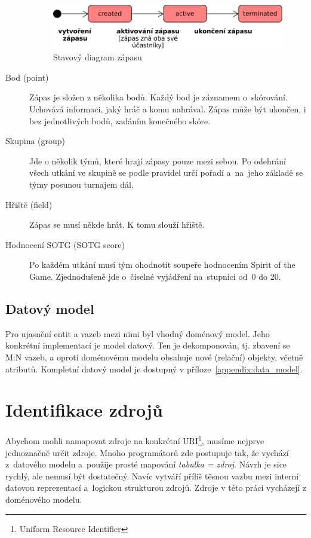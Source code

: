 \begin{description}
\begin{figure}[ht!]
      \includegraphics[width=110mm]{./images/stavovy-diagram-zapas.pdf}
      \caption{Stavový diagram zápasu\label{overflow}}
      \label{fig:state_match}
    \end{figure}
  \item[Bod (point)]
    Zápas je složen z několika bodů. Každý bod je záznamem o~skórování. Uchovává informaci, jaký hráč a komu nahrával.
    Zápas může být ukončen, i bez jednotlivých bodů, zadáním konečného skóre.
  \item[Skupina (group)]
    Jde o několik týmů, které hrají zápasy pouze mezi sebou. Po odehrání všech utkání ve skupině se podle pravidel určí pořadí a~na~jeho základě se týmy posunou turnajem dál.
  \item[Hřiště (field)]
    Zápas se musí někde hrát. K tomu slouží hřiště.
  \item[Hodnocení SOTG (SOTG score)]
    Po každém utkání musí tým ohodnotit soupeře hodnocením Spirit of the Game. Zjednodušeně jde o~číselné vyjádření na~stupnici od~0 do 20.
\end{description}

\subsection{Datový model}

Pro ujasnění entit a vazeb mezi nimi byl vhodný doménový model. Jeho konkrétní implementací je model datový.
Ten je dekomponován, tj. zbavení se M:N vazeb, a oproti doménovému modelu obsahuje nové
(relační) objekty, včetně atributů. Kompletní datový model je dostupný v příloze~\ref{appendix:data_model}.

\section{Identifikace zdrojů}


Abychom mohli namapovat zdroje na konkrétní URI\footnote{Uniform Resource Identifier},
musíme nejprve jednoznačně určit zdroje. Mnoho programátorů zde postupuje tak, že vychází
z~datového modelu a~použije prosté mapování \textit{tabulka = zdroj}.
Návrh je sice rychlý, ale nemusí být dostatečný. Navíc vytváří příliš těsnou vazbu mezi interní datovou reprezentací
a~logickou strukturou zdrojů. Zdroje v této práci vycházejí z doménového modelu.

